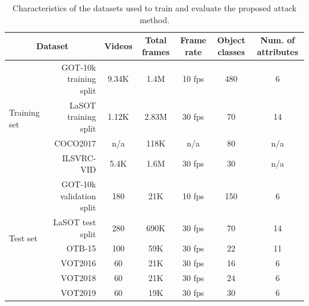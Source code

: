 \documentclass[journal]{IEEEtran}
\begin{document}
\begin{table}[t]
  \centering
  \caption{Characteristics of the datasets used to train and evaluate the proposed attack method.}
  \begin{tabular}{lrccccc} \toprule
  \multicolumn{2}{c}{Dataset}                            & Videos & Total frames & Frame rate & Object classes & Num. of attributes \\ \midrule
  \multirow{4}{*}{Training set} & GOT-10k training split & 9.34K  & 1.4M        & 10 fps     & 480            & 6                  \\
                                & LaSOT training split   & 1.12K  & 2.83M        & 30 fps     & 70             & 14                 \\
                                & COCO2017               & n/a    & 118K         & n/a        & 80             & n/a                \\
                                & ILSVRC-VID             & 5.4K   & 1.6M         & 30 fps     & 30             & n/a                \\ \midrule
  \multirow{7}{*}{Test set}     & GOT-10k validation split& 180   & 21K          & 10 fps     & 150            & 6                  \\
                                & LaSOT test split       & 280    & 690K         & 30 fps     & 70             & 14                 \\
                                & OTB-15                 & 100    & 59K          & 30 fps     & 22             & 11                 \\
                                & VOT2016                & 60     & 21K          & 30 fps     & 16             & 6                  \\
                                & VOT2018                & 60     & 21K          & 30 fps     & 24             & 6                  \\ 
                                & VOT2019                & 60     & 19K          & 30 fps     & 30             & 6                  \\ \bottomrule
  \end{tabular}
  \vspace{-4mm}
  \label{tab:dataset}
\end{table}
\end{document}
